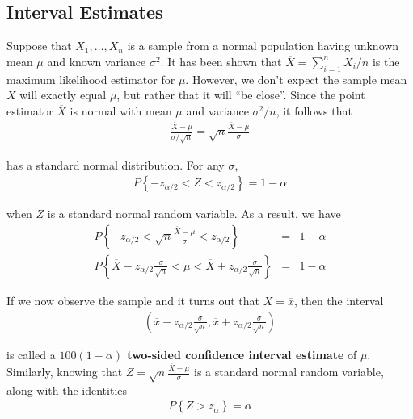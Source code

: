 \documentclass[12pt]{article}
\begin{document}
\subsection{Interval Estimates}

Suppose that $X_1, \dots, X_n$ is a sample from a normal population having unknown mean $\mu$ and known variance $\sigma^2$. It has been shown that $\overline{X} = \sum_{i=1}^n X_i / n$ is the maximum likelihood estimator for $\mu$. However, we don't expect the sample mean $\overline{X}$ will exactly equal $\mu$, but rather that it will ``be close''. Since the point estimator $\overline{X}$ is normal with mean $\mu$ and variance $\sigma^2 / n$, it follows that
\begin{eqnarray*}
  \frac {\overline{X} - \mu}{\sigma / \sqrt{n}}
  = \sqrt{n} \frac {\overline{X} - \mu}{\sigma}
\end{eqnarray*}

has a standard normal distribution. For any $\sigma$,
\begin{eqnarray*}
  P \left\{ - z_{\alpha / 2} < Z < z_{\alpha / 2} \right\} = 1 - \alpha
\end{eqnarray*}

when $Z$ is a standard normal random variable. As a result, we have
\begin{eqnarray*}
  P \left\{ - z_{\alpha / 2} < \sqrt{n} \frac {\overline{X} - \mu}{\sigma}
      < z_{\alpha / 2} \right\} &=& 1 - \alpha \\
  P \left\{ \overline{X} - z_{\alpha / 2} \frac {\sigma}{\sqrt{n}} < \mu
      < \overline{X} + z_{\alpha / 2} \frac {\sigma}{\sqrt{n}}
    \right\} &=& 1 - \alpha
\end{eqnarray*}

If we now observe the sample and it turns out that $\overline{X} = \overline{x}$, then the interval
\begin{eqnarray*}
  \left( \overline{x} - z_{\alpha / 2} \frac {\sigma}{\sqrt{n}},
    \overline{x} + z_{\alpha / 2} \frac {\sigma}{\sqrt{n}} \right)
\end{eqnarray*}

is called a \textbf{$100(1 - \alpha)$ two-sided confidence interval estimate} of $\mu$. \\

Similarly, knowing that $Z = \sqrt{n} \frac{\overline{X} - \mu}{\sigma}$ is a standard normal random variable, along with the identities
\begin{eqnarray*}
  P \left\{ Z > z_{\alpha} \right\} = \alpha
\end{eqnarray*}
\end{document}
